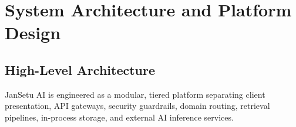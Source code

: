 \documentclass[12pt,a4paper,oneside]{report}
\begin{document}
\chapter{System Architecture and Platform Design}

\section{High-Level Architecture}
JanSetu AI is engineered as a modular, tiered platform separating client presentation, API gateways, security guardrails, domain routing, retrieval pipelines, in-process storage, and external AI inference services.
\end{document}
